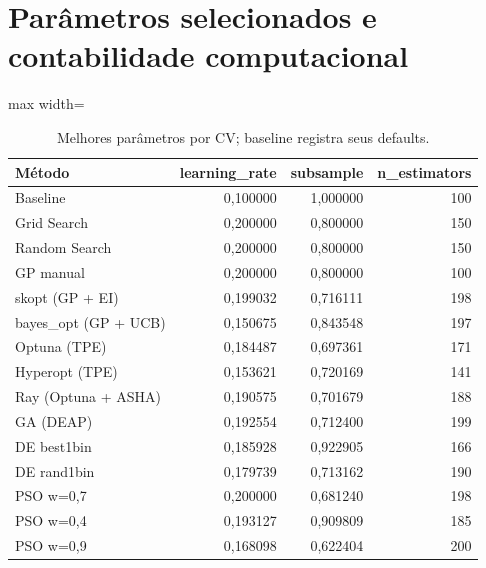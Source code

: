 \documentclass[12pt,a4paper]{article}
\begin{document}
\clearpage\appendix

\section{Parâmetros selecionados e contabilidade computacional}

\begin{table}[H]
\centering
\caption{Melhores parâmetros por CV; baseline registra seus defaults.}
\small
\setlength{\tabcolsep}{4.5pt}
\renewcommand{\arraystretch}{1.16}
\begin{adjustbox}{max width=\linewidth}
\begin{tabular}{@{}lrrr@{}}
\toprule
Método & learning\_rate & subsample & n\_estimators \\
\midrule
Baseline & 0{,}100000 & 1{,}000000 & 100 \\
Grid Search & 0{,}200000 & 0{,}800000 & 150 \\
Random Search & 0{,}200000 & 0{,}800000 & 150 \\
GP manual & 0{,}200000 & 0{,}800000 & 100 \\
skopt (GP + EI) & 0{,}199032 & 0{,}716111 & 198 \\
\addlinespace[3pt]
bayes\_opt (GP + UCB) & 0{,}150675 & 0{,}843548 & 197 \\
Optuna (TPE) & 0{,}184487 & 0{,}697361 & 171 \\
Hyperopt (TPE) & 0{,}153621 & 0{,}720169 & 141 \\
Ray (Optuna + ASHA) & 0{,}190575 & 0{,}701679 & 188 \\
GA (DEAP) & 0{,}192554 & 0{,}712400 & 199 \\
\addlinespace[3pt]
DE best1bin & 0{,}185928 & 0{,}922905 & 166 \\
DE rand1bin & 0{,}179739 & 0{,}713162 & 190 \\
PSO w=0,7 & 0{,}200000 & 0{,}681240 & 198 \\
PSO w=0,4 & 0{,}193127 & 0{,}909809 & 185 \\
PSO w=0,9 & 0{,}168098 & 0{,}622404 & 200 \\
\bottomrule
\end{tabular}
\end{adjustbox}
\end{table}
\end{document}
